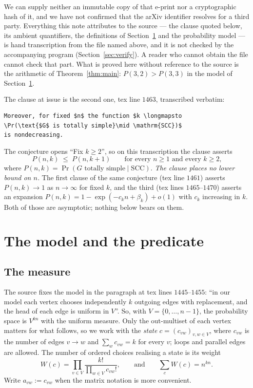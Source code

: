 \documentclass[11pt]{amsart}
\theoremstyle{remark}
\newcommand{\SCC}{\mathrm{SCC}}
\begin{document}
We can supply neither an immutable copy of that e-print nor a cryptographic hash of it, and
we have not confirmed that the arXiv identifier resolves for a third party.  Everything this
note attributes to the source --- the clause quoted below, its ambient quantifiers, the
definitions of Section~\ref{sec:model} and the probability model --- is hand transcription
from the file named above, and it is not checked by the accompanying program
(Section~\ref{sec:verify}).  A reader who cannot obtain the file cannot check that part.
What is proved here without reference to the source is the arithmetic of
Theorem~\ref{thm:main}: $P(3,2)>P(3,3)$ in the model of Section~\ref{sec:model}.

The clause at issue is the second one, tex line $1463$, transcribed verbatim:

\begin{verbatim}
Moreover, for fixed $n$ the function $k \longmapsto
\Pr(\text{$G$ is totally simple}\mid \mathrm{SCC})$
is nondecreasing.
\end{verbatim}

\noindent
The conjecture opens ``Fix $k\ge2$'', so on this transcription the clause asserts
\begin{equation}\label{eq:clause}
  P(n,k)\;\le\;P(n,k+1)
  \qquad\text{for every $n\ge1$ and every $k\ge2$,}
\end{equation}
where $P(n,k)=\Pr(G\text{ totally simple}\mid\SCC)$.  \emph{The clause places no lower
bound on $n$.}  The first clause of the same conjecture (tex line $1461$) asserts
$P(n,k)\to1$ as $n\to\infty$ for fixed $k$, and the third (tex lines $1465$--$1470$)
asserts an expansion $P(n,k)=1-\exp(-c_kn+\beta_k)+o(1)$ with $c_k$ increasing in $k$.
Both of those are asymptotic; nothing below bears on them.

\section{The model and the predicate}
\label{sec:model}

\subsection*{The measure}
The source fixes the model in the paragraph at tex lines $1445$--$1455$: ``in our model
each vertex chooses independently $k$ outgoing edges with replacement, and the head of
each edge is uniform in $V$''.  So, with $V=\{0,\dots,n-1\}$, the probability space is
$V^{kn}$ with the uniform measure.  Only the out-multiset of each vertex matters for what
follows, so we work with the \emph{state} $c=(c_{vw})_{v,w\in V}$, where $c_{vw}$ is the
number of edges $v\to w$ and $\sum_wc_{vw}=k$ for every $v$; loops and parallel edges are
allowed.  The number of ordered choices realising a state is its weight
\begin{equation}\label{eq:weight}
  W(c)=\prod_{v\in V}\frac{k!}{\prod_{w\in V}c_{vw}!},
  \qquad\text{and}\qquad
  \sum_{c}W(c)=n^{kn}.
\end{equation}
Write $a_{vw}:=c_{vw}$ when the matrix notation is more convenient.
\end{document}
